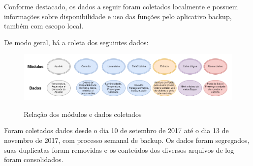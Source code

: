 Conforme destacado, os dados a seguir foram coletados localmente e possuem informações sobre disponibilidade e uso das funções pelo aplicativo backup, também com escopo local.

De modo geral, há a coleta dos seguintes dados:

\begin{figure}[H]
	\centering
	\caption{Relação dos módulos e dados coletados}
	\includegraphics[width=1.0\textwidth]{DiagramaModulosDados}
	\label{fig:DiagramaModulosDados}
\end{figure}

Foram coletados dados desde o dia 10 de setembro de 2017 até o dia 13 de novembro de 2017, com processo semanal de backup. Os dados foram segregados, suas duplicatas foram removidas e os conteúdos dos diversos arquivos de log foram consolidados.

